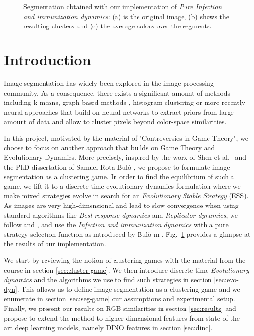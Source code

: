 \documentclass[11pt,a4paper]{article}
\begin{document}
\begin{figure}[H]
\begin{subfigure}[b]{0.3\textwidth}
        \caption{ }
    \end{subfigure}
       \caption{Segmentation obtained with our implementation of \textit{Pure Infection and immunization dynamics}: (a) is the original image, (b) shows the resulting clusters and (c) the average colors over the segments.}
       \label{fig:teaser}
\end{figure}

\section{Introduction}

Image segmentation has widely been explored in the image processing community. As a consequence, there exists a significant amount of methods including k-means, graph-based methods \cite{graph-segmentation}, histogram clustering \cite{histogram-clustering} or more recently neural approaches that build on neural networks to extract priors from large amount of data \cite{panoptic-segmentation} and allow to cluster pixels beyond color-space similarities.

In this project, motivated by the material of "Controversies in Game Theory"\cite{course-gt}, we choose to focus on another approach that builds on Game Theory and Evolutionary Dynamics. More precisely, inspired by the work of Shen et al.~\cite{game-clustering} and the PhD dissertation of Samuel Rota Bulò \cite{bulo-thesis}, we propose to formulate image segmentation as a clustering game. In order to find the equilibrium of such a game, we lift it to a discrete-time evolutionary dynamics formulation where we make mixed strategies evolve in search for an \textit{Evolutionary Stable Strategy} (ESS). As images are very high-dimensional and lead to slow convergence when using standard algorithms like \textit{Best response dynamics} and \textit{Replicator dynamics}, we follow \cite{game-clustering} and \cite{bulo-thesis}, and use the \textit{Infection and immunization dynamics} with a pure strategy selection function as introduced by Bulò in \cite{inimdyn}. Fig.~\ref{fig:teaser} provides a glimpse at the results of our implementation.

We start by reviewing the notion of clustering games with the material from the course \cite{course-gt} in section \ref{sec:cluster-game}. We then introduce discrete-time \textit{Evolutionary dynamics} and the algorithms we use to find such strategies in section \ref{sec:evo-dyn}. This allows us to define image segmentation as a clustering game and we enumerate in section \ref{sec:seg-game} our assumptions and experimental setup. Finally, we present our results on RGB similarities in section \ref{sec:results} and propose to extend the method to higher-dimensional features from state-of-the-art deep learning models, namely DINO features \cite{dino} in section \ref{sec:dino}.
\end{document}
